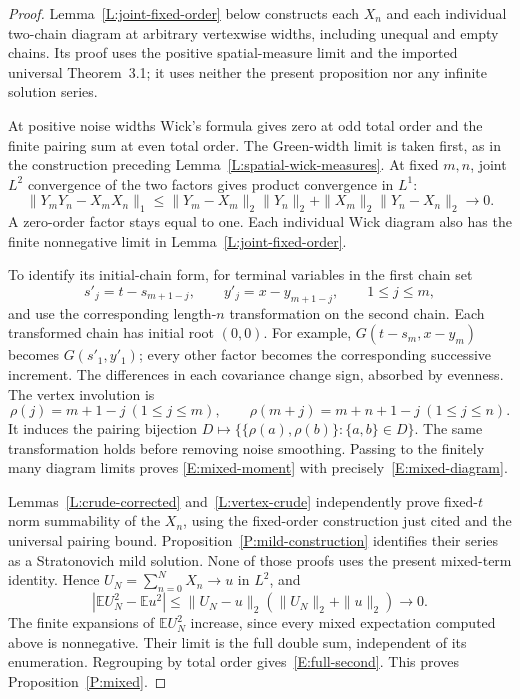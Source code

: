 \documentclass[12pt]{article}
\numberwithin{equation}{section}
\theoremstyle{definition}
\newcommand{\E}{\mathbb{E}}
\begin{document}
\begin{proof}
  Lemma~\ref{L:joint-fixed-order} below constructs each $X_n$ and each
  individual two-chain diagram at arbitrary vertexwise widths, including
  unequal and empty chains. Its proof uses the positive spatial-measure
  limit and the imported universal Theorem~3.1; it uses neither the present
  proposition nor any infinite solution series.

  At positive noise widths Wick's formula gives zero at odd total order
  and the finite pairing sum at even total order. The Green-width limit
  is taken first, as in the construction preceding
  Lemma~\ref{L:spatial-wick-measures}. At fixed $m,n$, joint $L^2$
  convergence of the two factors gives product convergence in $L^1$:
  \[
    \|Y_mY_n-X_mX_n\|_1
    \le\|Y_m-X_m\|_2\|Y_n\|_2
    +\|X_m\|_2\|Y_n-X_n\|_2\longrightarrow0.
  \]
  A zero-order factor stays equal to one. Each individual Wick diagram
  also has the finite nonnegative limit in
  Lemma~\ref{L:joint-fixed-order}.

  To identify its initial-chain form, for terminal variables in the
  first chain set
  \[
    s'_j=t-s_{m+1-j},\qquad y'_j=x-y_{m+1-j},\qquad1\le j\le m,
  \]
  and use the corresponding length-$n$ transformation on the second
  chain. Each transformed chain has initial root $(0,0)$.
  For example, $G(t-s_m,x-y_m)$ becomes $G(s'_1,y'_1)$;
  every other factor becomes the corresponding successive increment.
  The differences in each covariance change sign, absorbed by evenness.
  The vertex involution is
  \[
    \rho(j)=m+1-j\ (1\le j\le m),\qquad
    \rho(m+j)=m+n+1-j\ (1\le j\le n).
  \]
  It induces the pairing bijection
  $D\mapsto\{\{\rho(a),\rho(b)\}:\{a,b\}\in D\}$.
  The same transformation holds before removing noise smoothing.
  Passing to the finitely many diagram limits proves
  \eqref{E:mixed-moment} with precisely~\eqref{E:mixed-diagram}.

  Lemmas~\ref{L:crude-corrected} and~\ref{L:vertex-crude} independently
  prove fixed-$t$ norm summability of the $X_n$, using the fixed-order
  construction just cited and the universal pairing bound.
  Proposition~\ref{P:mild-construction} identifies their series as a
  Stratonovich mild solution. None of those proofs uses the present
  mixed-term identity. Hence $U_N=\sum_{n=0}^N X_n\to u$ in $L^2$, and
  \[
    |\E U_N^2-\E u^2|
    \le\|U_N-u\|_2(\|U_N\|_2+\|u\|_2)\longrightarrow0.
  \]
  The finite expansions of $\E U_N^2$ increase, since every mixed
  expectation computed above is nonnegative. Their limit is the full
  double sum, independent of its enumeration. Regrouping by total order
  gives~\eqref{E:full-second}. This proves Proposition~\ref{P:mixed}.
\end{proof}
\end{document}

